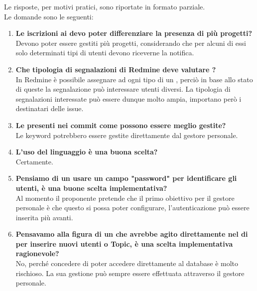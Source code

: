     	Le risposte, per motivi pratici, sono riportate in formato parziale.\\
        Le domande sono le seguenti:
    	\begin{enumerate}
    		\item \textbf{Le iscrizioni ai  devo poter differenziare la presenza di più progetti?}\\
            Devono poter essere gestiti più progetti, considerando che per alcuni di essi solo determinati tipi di utenti devono riceverne la notifica.
    		\item \textbf{Che tipologia di segnalazioni di Redmine deve valutare \progetto?}\\
            In Redmine è possibile assegnare ad ogni tipo di  un , perciò in base allo stato di queste la segnalazione può interessare utenti diversi. La tipologia di segnalazioni interessate può essere dunque molto ampia, importano però i destinatari delle issue.
    		\item \textbf{Le  presenti nei commit come possono essere meglio gestite?}\\
            Le keyword potrebbero essere gestite direttamente dal gestore personale.
    		\item \textbf{L'uso del linguaggio  è una buona scelta?}\\
            Certamente.
    		\item \textbf{Pensiamo di un usare un campo "password" per identificare gli utenti, è una buone scelta implementativa?}\\
            Al momento il proponente pretende che il primo obiettivo per il gestore personale è che questo si possa poter configurare, l'autenticazione può essere inserita più avanti.
    		\item \textbf{Pensavamo alla figura di un  che avrebbe agito direttamente nel  di  per inserire nuovi utenti o Topic, è una scelta implementativa ragionevole?}\\
            No, perché concedere di poter accedere direttamente al database è molto rischioso. La sua gestione può sempre essere effettuata attraverso il gestore personale.
    	\end{enumerate}
